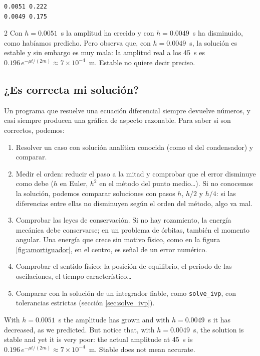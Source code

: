 \begin{verbatim}
0.0051 0.222
0.0049 0.175
\end{verbatim}
\begin{paracol}{2}
Con $h=0.0051$~s la amplitud ha crecido y con $h=0.0049$~s ha disminuido, como habíamos predicho. Pero observa que, con $h=0.0049$~s, la solución es estable y sin embargo es muy mala: la amplitud real a los 45~s es $0.196\,e^{-\mu t/(2m)}\approx 7\times10^{-4}$~m. Estable no quiere decir preciso.

\subsection{¿Es correcta mi solución?}\label{sec:verifica_edo}
Un programa que resuelve una ecuación diferencial siempre devuelve números, y casi siempre producen una gráfica de aspecto razonable. Para saber si son correctos, podemos:
\begin{enumerate}
\item Resolver un caso con solución analítica conocida (como el del condensador) y comparar.
\item Medir el orden: reducir el paso a la mitad y comprobar que el error disminuye como debe ($h$ en Euler, $h^2$ en el método del punto medio\ldots). Si no conocemos la solución, podemos comparar soluciones con pasos $h$, $h/2$ y $h/4$: si las diferencias entre ellas no disminuyen según el orden del método, algo va mal.
\item Comprobar las leyes de conservación. Si no hay rozamiento, la energía mecánica debe conservarse; en un problema de órbitas, también el momento angular. Una energía que crece sin motivo físico, como en la figura \ref{fig:amortiguador}, en el centro, es señal de un error numérico.
\item Comprobar el sentido físico: la posición de equilibrio, el periodo de las oscilaciones, el tiempo característico\ldots
\item Comparar con la solución de un integrador fiable, como \texttt{solve_ivp}, con tolerancias estrictas (sección \ref{sec:solve_ivp}).
\end{enumerate}

\switchcolumn
With $h=0.0051$~s the amplitude has grown and with $h=0.0049$~s it has decreased, as we predicted. But notice that, with $h=0.0049$~s, the solution is stable and yet it is very poor: the actual amplitude at 45~s is $0.196\,e^{-\mu t/(2m)}\approx 7\times10^{-4}$~m. Stable does not mean accurate.


\end{paracol}
